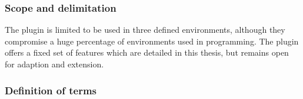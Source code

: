 \subsubsection{Scope and delimitation}
The plugin is limited to be used in three defined environments, although they compromise a huge percentage of environments used in programming. The plugin offers a fixed set of features which are detailed in this thesis, but remains open for adaption and extension.
\subsubsection{Definition of terms}
